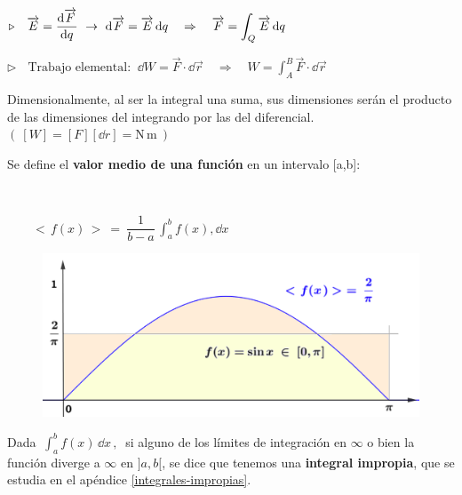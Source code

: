 \hspace{1cm} \vspace{3mm} $\triangleright \displaystyle \quad \overrightarrow E=\dv{\overrightarrow F}{q} \ \to \ \dd \overrightarrow F = \overrightarrow E \, \dd q \quad \Rightarrow \quad \overrightarrow F = \int_Q \overrightarrow E \, \dd q$

\hspace{1cm} \vspace{3mm} $\triangleright \displaystyle \ \ \, \text{ Trabajo elemental: } \  \dd W = \overrightarrow F \cdot \dd \vec r \quad \Rightarrow \quad W=\int_A^B \overrightarrow F \cdot \dd \vec r$ 

\vspace{5mm} Dimensionalmente, al ser la integral una suma, sus dimensiones serán el producto de las dimensiones del integrando por las del diferencial. $\quad$ \textcolor{gris}{$(\ [W]=[F][\dd r]=\mathrm N \, \mathrm m \ ) $ }

\vspace{1cm}
Se define el \textbf{valor medio de una función} en un intervalo [a,b]:
\begin{multicols}{2}
$\quad$

$\qquad  <\, f(x)\,> \ = \ \displaystyle \dfrac 1 {b-a}\, \int_a^b f(x), \dd x $

\begin{figure}[H]
	\centering
	\includegraphics[width=.4\textwidth]{imagenes/T02IM04.png}
\end{figure}
\end{multicols}

Dada $\ \displaystyle \int_a^b f(x)\, \dd x \, , \ $ si alguno de los límites de integración en $\infty$ o bien la función diverge a $\infty$ en $]a,b[$, se dice que tenemos una \textbf{integral impropia}, que se estudia en el apéndice \ref{integrales-impropias}. 

\vspace{10mm}


